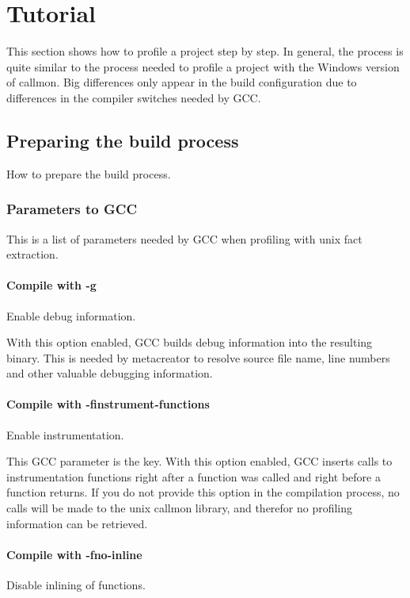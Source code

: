 
\section{Tutorial}
\label{sec:Tutorial}
This section shows how to profile a project step by step. In general, the process is quite similar to the process needed to profile a project with the Windows version of callmon. Big differences only appear in the build configuration due to differences in the compiler switches needed by GCC.

\subsection{Preparing the build process} How to prepare the build process.

\subsubsection{Parameters to GCC} This is a list of parameters needed by GCC when profiling with unix fact extraction.

\paragraph{Compile with -g} Enable debug information.

With this option enabled, GCC builds debug information into the resulting binary. This is needed by metacreator to resolve source file name, line numbers and other valuable debugging information.

\paragraph{Compile with -finstrument-functions} Enable instrumentation.

This GCC parameter is the key. With this option enabled, GCC inserts calls to instrumentation functions right after a function was called and right before a function returns. If you do not provide this option in the compilation process, no calls will be made to the unix callmon library, and therefor no profiling information can be retrieved.

\paragraph{Compile with -fno-inline} Disable inlining of functions.

